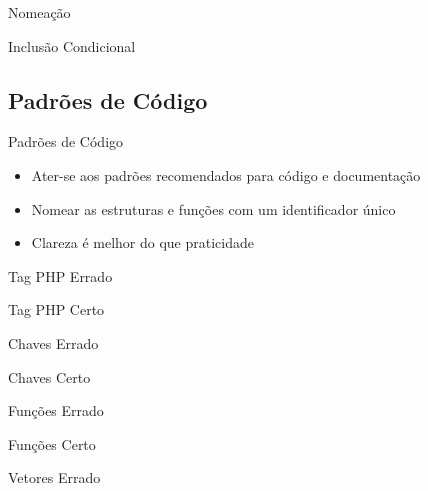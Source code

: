 \documentclass{beamer}
\begin{document}
\begin{frame}{Nomeação}
  \pause 
\end{frame}

\begin{frame}{Inclusão Condicional}
  \pause 
\end{frame}

\subsection{Padrões de Código}

\begin{frame}{Padrões de Código}
\begin{itemize}
  \pause \item Ater-se aos padrões recomendados para código e documentação
  \pause \item Nomear as estruturas e funções com um identificador único
  \pause \item Clareza é melhor do que praticidade
\end{itemize}
\end{frame}

\begin{frame}{Tag PHP}
  \pause Errado
  
\end{frame}

\begin{frame}{Tag PHP}
  Certo
  
\end{frame}

\begin{frame}{Chaves}
  Errado
  
\end{frame}

\begin{frame}{Chaves}
  Certo
  
\end{frame}

\begin{frame}{Funções}
  Errado
  
\end{frame}

\begin{frame}{Funções}
  Certo
  
\end{frame}

\begin{frame}{Vetores}
  Errado
  
\end{frame}
\end{document}
